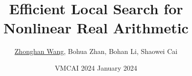 \author{\underline{Zhonghan Wang}, Bohua Zhan, Bohan Li, Shaowei Cai}
\title{Efficient Local Search for Nonlinear Real Arithmetic}
\date{VMCAI 2024  January 2024}

